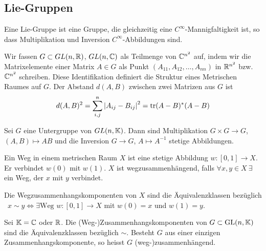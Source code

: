 \subsection{Lie-Gruppen}

\begin{definition}
    Eine Lie-Gruppe ist eine Gruppe, die gleichzeitig eine $C^\infty$-Mannigfaltigkeit
    ist, so dass Multiplikation und Inversion $C^\infty$-Abbildungen sind.
\end{definition}

\begin{definition}
    Wir fassen $G \subset GL(n,\mathbb{R})$, $GL(n,\mathbb{C})$ als Teilmenge von
    $\mathbb{C}^{n^2}$ auf, indem wir die Matrixelemente einer Matrix $A \in G$
    als Punkt $(A_{11} , A_{12} , \dots , A_{nn})$ in $\mathbb{R}^{n^2}$ bzw.
    $\mathbb{C}^{n^2}$ schreiben. Diese Identifikation definiert die Struktur
    eines Metrischen Raumes auf $G$. Der Abstand $d(A,B)$ zwischen zwei
    Matrizen aus $G$ ist
    \begin{align*}
        d(A,B)^2 = \sum_{i,j}^n \left\vert A_{ij} - B_{ij} \right\vert^2 = \text{tr}(A-B)^\ast (A-B)
    \end{align*}
\end{definition}

\begin{satz}
    Sei $G$ eine Untergruppe von $GL(n,\mathbb{K})$. Dann sind Multiplikation
    $G \times G \rightarrow G$, $(A,B) \mapsto AB$ und die Inversion
    $G \rightarrow G$, $A \mapsto A^{-1}$ stetige Abbildungen.
\end{satz}

\begin{definition}[Weg]
    Ein Weg in einem metrischen Raum $X$ ist eine stetige Abbildung
    $w: [0,1] \rightarrow X$. Er verbindet $w(0)$ mit $w(1)$. $X$ ist
    wegzusammenhängend, falls $\forall x,y \in X \ \exists$ ein Weg, der
    $x$ mit $y$ verbindet.
\end{definition}

\begin{satz}
    Die Wegzusammenhangskomponenten von $X$ sind die Äquivalenzklassen
    bezüglich \ $x \sim y \Leftrightarrow \exists \text{Weg } w:[0,1] \rightarrow X$
    mit $w(0) = x$ und $w(1) = y$.
\end{satz}

\begin{definition}
    Sei $\mathbb{K} = \mathbb{C}$ oder $\mathbb{R}$. Die (Weg-)Zusammenhangskomponenten von $G \subset \text{GL}(n,\mathbb{K})$
    sind die Äquivalenzklassen bezüglich $\sim$. Besteht $G$ aus einer einzigen
    Zusammenhangskomponente, so heisst $G$ (weg-)zusammenhängend.
\end{definition}

